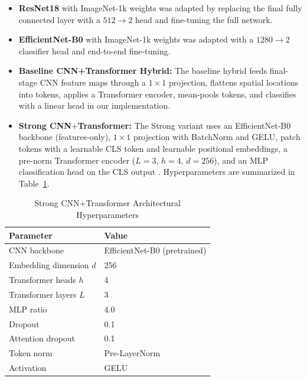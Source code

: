 \documentclass[preprint,12pt,authoryear]{elsarticle}
\begin{document}
\begin{itemize}
\item \textbf{ResNet18} \citep{he2016resnet} with ImageNet-1k weights was adapted by replacing the final fully connected layer with a $512 \rightarrow 2$ head and fine-tuning the full network. 
\item \textbf{EfficientNet-B0} \citep{tan2019efficientnet} with ImageNet-1k weights was adapted with a $1280 \rightarrow 2$ classifier head and end-to-end fine-tuning.
\item \textbf{Baseline CNN+Transformer Hybrid:} The baseline hybrid feeds final-stage CNN feature maps through a $1 \times 1$ projection, flattens spatial locations into tokens, applies a Transformer encoder, mean-pools tokens, and classifies with a linear head in our implementation.
\item \textbf{Strong CNN$+$Transformer:} The Strong variant uses an EfficientNet-B0 backbone (features-only), $1 \times 1$ projection with BatchNorm and GELU, patch tokens with a learnable CLS token and learnable positional embeddings, a pre-norm Transformer encoder ($L{=}3$, $h{=}4$, $d{=}256$), and an MLP classification head on the CLS output \citep{rw2019timm}. Hyperparameters are summarized in Table~\ref{strongconfig}.
\end{itemize}



\begin{table}
  \caption{Strong CNN+Transformer Architectural Hyperparameters}
  \label{strongconfig}
  \centering
  \begin{tabular}{ll}
    \toprule
    \textbf{Parameter}        & \textbf{Value} \\
    \midrule
    CNN backbone              & EfficientNet-B0 (pretrained) \\
    Embedding dimension $d$   & 256 \\
    Transformer heads $h$     & 4 \\
    Transformer layers $L$    & 3 \\
    MLP ratio                 & 4.0 \\
    Dropout                   & 0.1 \\
    Attention dropout         & 0.1 \\
    Token norm                & Pre-LayerNorm \\
    Activation                & GELU \\
    \bottomrule
  \end{tabular}
\end{table}
\end{document}
